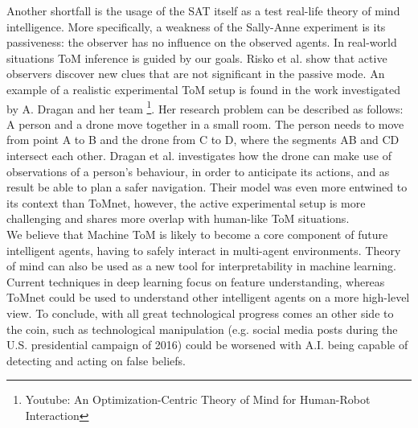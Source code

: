 \documentclass[twocolumn,superscriptaddress,aps]{revtex4-1}
\begin{document}
\indent Another shortfall is the usage of the SAT itself as a test real-life theory of mind intelligence. More specifically, a weakness of the Sally-Anne experiment is its passiveness: the observer has no influence on the observed agents. In real-world situations ToM inference is guided by our goals. Risko et al. \cite{risko} show that active observers discover new clues that are not significant in the passive mode. An example of a realistic experimental ToM setup is found in the work investigated by A. Dragan and her team \footnote{Youtube: An Optimization-Centric Theory of Mind for Human-Robot Interaction}. Her research problem can be described as follows: A person and a drone move together in a small room. The person needs to move from point A to B and the drone from C to D, where the segments AB and CD intersect each other. Dragan et al. investigates how the drone can make use of observations of a person's behaviour, in order to anticipate its actions, and as result be able to plan a safer navigation. Their model was even more entwined to its context than ToMnet, however, the active experimental setup is more challenging and shares more overlap with human-like ToM situations. \\

\indent We believe that Machine ToM is likely to become a core component of future intelligent agents, having to safely interact in multi-agent environments. Theory of mind can also be used as a new tool for interpretability in machine learning. Current techniques in deep learning focus on feature understanding, whereas ToMnet could be used to understand other intelligent agents on a more high-level view. To conclude, with all great technological progress comes an other side to the coin, such as technological manipulation (e.g. social media posts during the U.S. presidential campaign of 2016) could be worsened with A.I. being capable of detecting and acting on false beliefs.






\end{document}
